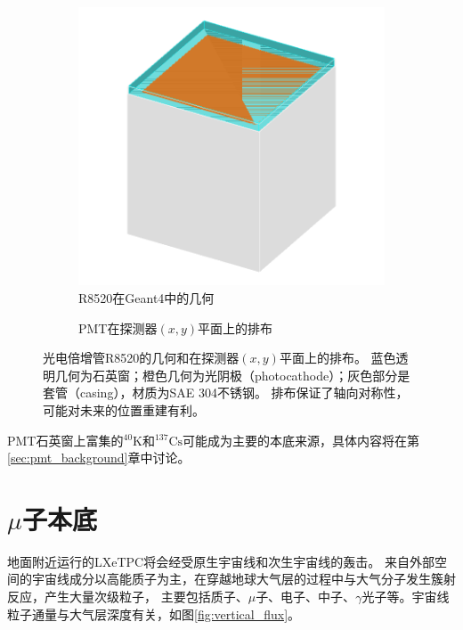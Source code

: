\begin{figure}
  \begin{subfigure}{.5\textwidth}
    \centering
    \includegraphics[width=1.0\linewidth]{figures/pmt_geo.png}
    \caption{\label{fig:pmt_g4} R8520在Geant4中的几何}
  \end{subfigure}
  \begin{subfigure}{.5\textwidth}
    \centering
    
    \caption{\label{fig:pmt_layout} PMT在探测器$(x,y)$平面上的排布}
  \end{subfigure}
  \caption{\label{fig:pmt_geo} 光电倍增管R8520的几何和在探测器$(x,y)$平面上的排布。
  蓝色透明几何为石英窗；橙色几何为光阴极（photocathode）；灰色部分是套管（casing），材质为SAE 304不锈钢。
  排布保证了轴向对称性，可能对未来的位置重建有利。}
\end{figure}

PMT石英窗上富集的${}^{40}\mathrm{K}$和${}^{137}\mathrm{Cs}$可能成为主要的本底来源，具体内容将在第\ref{sec:pmt_background}章中讨论。

\section{$\mu$子本底}

地面附近运行的LXeTPC将会经受原生宇宙线和次生宇宙线的轰击。
来自外部空间的宇宙线成分以高能质子为主，在穿越地球大气层的过程中与大气分子发生簇射反应，产生大量次级粒子，
主要包括质子、$\mu$子、电子、中子、$\gamma$光子等。宇宙线粒子通量与大气层深度有关，如图\ref{fig:vertical_flux}。

